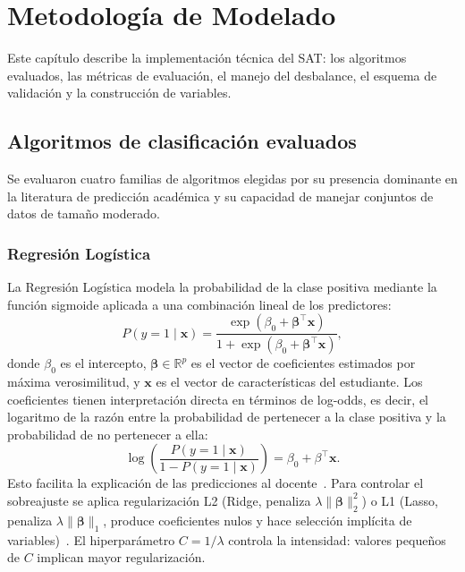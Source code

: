 \documentclass[12pt, letterpaper, openany]{report}
\begin{document}
\chapter{Metodología de Modelado}
\label{chap:metodologia}

Este capítulo describe la implementación técnica del SAT: los algoritmos evaluados, las métricas de evaluación, el manejo del desbalance, el esquema de validación y la construcción de variables.

\section{Algoritmos de clasificación evaluados}

Se evaluaron cuatro familias de algoritmos elegidas por su presencia dominante en la literatura de predicción académica \cite{Lopez2021} y su capacidad de manejar conjuntos de datos de tamaño moderado.

\subsection{Regresión Logística}

La Regresión Logística modela la probabilidad de la clase positiva mediante la función sigmoide aplicada a una combinación lineal de los predictores:
\begin{equation}
  P(y=1 \mid \mathbf{x}) =
  \frac{\exp(\beta_0 + \boldsymbol{\beta}^\top \mathbf{x})}
       {1 + \exp(\beta_0 + \boldsymbol{\beta}^\top \mathbf{x})},
\end{equation}
donde $\beta_0$ es el intercepto, $\boldsymbol{\beta} \in \mathbb{R}^p$ es el vector de 
coeficientes estimados por máxima verosimilitud, y $\mathbf{x}$ es el vector de 
características del estudiante. Los coeficientes tienen interpretación directa en términos de log-odds, es decir, el logaritmo de la razón entre la probabilidad de pertenecer a la clase positiva y la probabilidad de no pertenecer a ella:
\begin{equation}
\log\left(\frac{P(y=1 \mid \mathbf{x})}{1-P(y=1 \mid \mathbf{x})}\right)
= \beta_0 + \beta^\top \mathbf{x}.
\end{equation}
Esto facilita la explicación de las predicciones al docente~\cite{Lopez2021}. Para controlar el 
sobreajuste se aplica regularización L2 (Ridge, penaliza $\lambda\|\boldsymbol{\beta}\|_2^2$) 
o L1 (Lasso, penaliza $\lambda\|\boldsymbol{\beta}\|_1$, produce coeficientes nulos y hace 
selección implícita de variables)~\cite{Hastie2009}. El hiperparámetro $C = 1/\lambda$ controla 
la intensidad: valores pequeños de $C$ implican mayor regularización.
\end{document}
